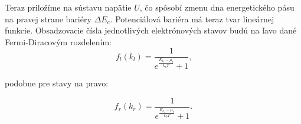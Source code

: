Teraz priložíme na sústavu napätie $U$, čo spôsobí zmenu dna energetického pásu na 
pravej strane bariéry $\Delta E_c$.  Potenciálová bariéra má teraz tvar lineárnej funkcie.
Obsadzovacie čísla jednotlivých elektrónových stavov budú na ľavo dané Fermi-Diracovým rozdelením:
\begin{equation}
 \label{eq:02fermidirac_left}
 f_l(k_l)=\frac{1}{e^{\frac{E_{k_l}-\mu_l}{k_bT}}+1}\text{,}
\end{equation} 

podobne pre stavy na pravo:

\begin{equation}
 \label{eq:02fermidirac_right}
 f_r(k_r)=\frac{1}{e^{\frac{E_{k_r}-\mu_r}{k_bT}}+1}\text{.}
\end{equation} 




